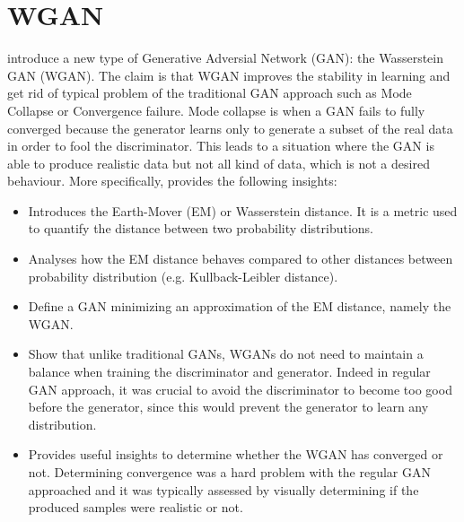 \documentclass[11pt,a4paper,twoside]{report}
\begin{document}





\section{WGAN}

\cite{arjovsky2017wasserstein} introduce a new type of Generative Adversial Network (GAN): the Wasserstein GAN (WGAN). The claim is that WGAN improves the stability in learning and get rid of typical problem of the traditional GAN approach such as Mode Collapse or Convergence failure. Mode collapse is when a GAN fails to fully converged because the generator learns only to generate a subset of the real data in order to fool the discriminator. This leads to a situation where the GAN is able to produce realistic data but not all kind of data, which is not a desired behaviour. More specifically, \cite{arjovsky2017wasserstein} provides the following insights:

\begin{itemize}
    \item Introduces the Earth-Mover (EM) or Wasserstein distance. It is a metric used to quantify the distance between two probability distributions.
    \item Analyses how the EM distance behaves compared to other distances between probability distribution (e.g. Kullback-Leibler distance).
    \item Define a GAN minimizing an approximation of the EM distance, namely the WGAN.
    \item Show that unlike traditional GANs, WGANs do not need to maintain a balance when training the discriminator and generator. Indeed in regular GAN approach, it was crucial to avoid the discriminator to become too good before the generator, since this would prevent the generator to learn any distribution.
    \item Provides useful insights to determine whether the WGAN has converged or not. Determining convergence was a hard problem with the regular GAN approached and it was typically assessed by visually determining if the produced samples were realistic or not.
\end{itemize}
\end{document}
